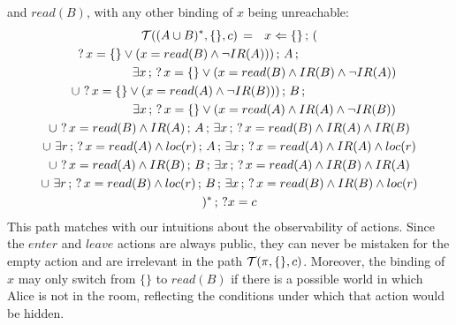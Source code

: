 and $read(B)$, with any other binding of $x$ being unreachable:\begin{multline*}
\mathcal{T}((A\cup B)^{*},\{\},c)\,=\,\,\,\, x\Leftarrow\{\}\,;\,(\\
?\, x=\{\}\vee(x=read(B)\wedge\neg IR(A)))\,;\, A\,;\,\,\,\,\,\,\,\,\,\,\,\,\,\,\,\,\,\,\,\,\,\,\,\,\,\,\,\,\,\,\,\,\,\,\,\,\,\,\,\,\\
\,\,\,\,\,\,\,\,\,\,\,\,\,\,\,\,\,\,\,\,\,\,\,\,\,\,\,\,\,\,\,\,\,\,\exists x\,;\,?\, x=\{\}\vee(x=read(B)\wedge IR(B)\wedge\neg IR(A))\\
\cup\,\,?\, x=\{\}\vee(x=read(A)\wedge\neg IR(B)))\,;\, B\,;\,\,\,\,\,\,\,\,\,\,\,\,\,\,\,\,\,\,\,\,\,\,\,\,\,\,\,\,\,\,\,\,\,\,\,\,\,\,\,\,\\
\,\,\,\,\,\,\,\,\,\,\,\,\,\,\,\,\,\,\,\,\,\,\,\,\,\,\,\,\,\,\,\,\,\,\exists x\,;\,?\, x=\{\}\vee(x=read(A)\wedge IR(A)\wedge\neg IR(B))\\
\cup\,\,?\, x=read(B)\wedge IR(A)\,;\, A\,;\,\exists x\,;\,?\, x=read(B)\wedge IR(A)\wedge IR(B)\\
\cup\,\,\exists r\,;\,?\, x=read(A)\wedge loc(r)\,;\, A\,;\,\exists x\,;\,?\, x=read(A)\wedge IR(A)\wedge loc(r)\\
\cup\,\,?\, x=read(A)\wedge IR(B)\,;\, B\,;\,\exists x\,;\,?\, x=read(A)\wedge IR(B)\wedge IR(A)\\
\cup\,\,\exists r\,;\,?\, x=read(B)\wedge loc(r)\,;\, B\,;\,\exists x\,;\,?\, x=read(B)\wedge IR(B)\wedge loc(r)\\
)^{*}\,;\,?x=c\end{multline*}
 This path matches with our intuitions about the observability of
actions. Since the $enter$ and $leave$ actions are always public,
they can never be mistaken for the empty action and are irrelevant
in the path $\mathcal{T}(\pi,\{\},c)$. Moreover, the binding of $x$ may
only switch from $\{\}$ to $read(B)$ if there is a possible world
in which Alice is not in the room, reflecting the conditions under
which that action would be hidden.

